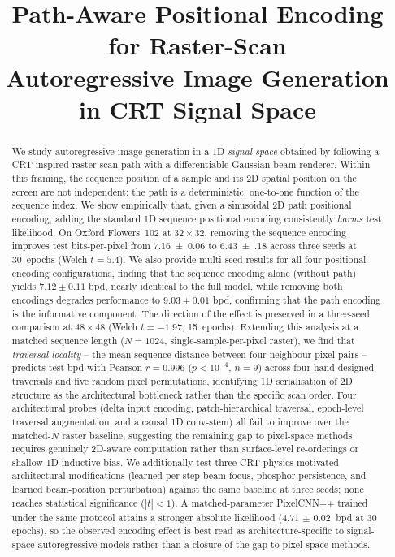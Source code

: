 \documentclass[conference,a4paper]{IEEEtran}
\begin{document}
\title{Path-Aware Positional Encoding for Raster-Scan\\
Autoregressive Image Generation in CRT Signal Space}

\author{}

\maketitle


\begin{abstract}
We study autoregressive image generation in a 1D \emph{signal space}
obtained by following a CRT-inspired raster-scan path with a
differentiable Gaussian-beam renderer. Within this framing, the
sequence position of a sample and its 2D spatial position on the
screen are not independent: the path is a deterministic, one-to-one
function of the sequence index. We show empirically that, given a
sinusoidal 2D path positional encoding, adding the standard 1D
sequence positional encoding consistently \emph{harms} test
likelihood. On Oxford Flowers~102 at $32\times32$, removing the
sequence encoding improves test bits-per-pixel from
\num{7.16(6)} to \num{6.43(18)} across three seeds at 30~epochs
(Welch $t=5.4$). We also provide multi-seed results for all four
positional-encoding configurations, finding that the sequence
encoding alone (without path) yields $7.12\pm0.11$ bpd, nearly
identical to the full model, while removing both encodings
degrades performance to $9.03\pm0.01$ bpd, confirming that the
path encoding is the informative component. The direction of the
effect is preserved in a three-seed comparison at $48\times48$
(Welch $t=-1.97$, 15~epochs).
Extending this analysis at a matched sequence length
($N{=}1024$, single-sample-per-pixel raster), we find that
\emph{traversal locality} -- the mean sequence distance between
four-neighbour pixel pairs -- predicts test bpd with Pearson
$r=0.996$ ($p<10^{-4}$, $n=9$) across four hand-designed
traversals and five random pixel permutations, identifying
1D serialisation of 2D structure as the architectural
bottleneck rather than the specific scan order. Four
architectural probes (delta input encoding, patch-hierarchical
traversal, epoch-level traversal augmentation, and a causal 1D
conv-stem) all fail to improve over the matched-$N$ raster
baseline, suggesting the remaining gap to pixel-space methods
requires genuinely 2D-aware computation rather than
surface-level re-orderings or shallow 1D inductive bias.
We additionally test
three CRT-physics-motivated architectural modifications
(learned per-step beam focus, phosphor persistence, and learned
beam-position perturbation) against the same baseline at three seeds;
none reaches statistical significance ($|t|<1$). A matched-parameter
PixelCNN++ trained under the same protocol attains a stronger
absolute likelihood ($\SI{4.71(2)}{}$ bpd at 30 epochs), so the
observed encoding effect is best read as architecture-specific to
signal-space autoregressive models rather than a closure of the
gap to pixel-space methods.
\end{abstract}
\end{document}

